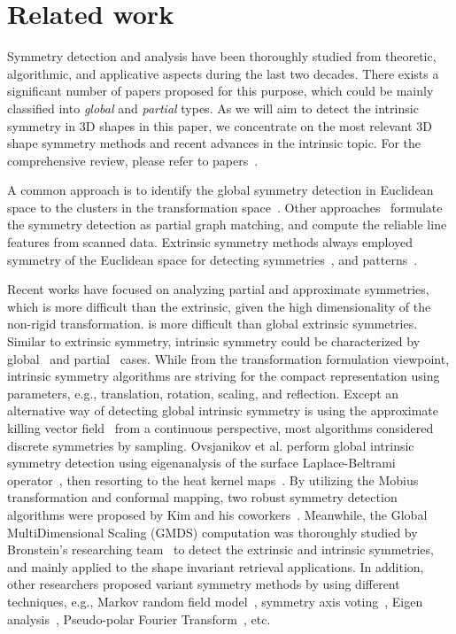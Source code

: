 \section{Related work}
\label{sec:related}

Symmetry detection and analysis have been thoroughly studied from theoretic, algorithmic, and applicative aspects during the last two decades.
There exists a significant number of papers proposed for this purpose, which could be mainly classified into \emph{global} and \emph{partial} types.
As we will aim to detect the intrinsic symmetry in 3D shapes in this paper, we concentrate on the most relevant 3D shape symmetry methods and recent advances in the intrinsic topic.
For the comprehensive review, please refer to papers~\cite{xu2009,berner2011}.

A common approach is to identify the global symmetry detection in Euclidean space to the clusters in the transformation space~\cite{mitra2006,podolak2006,pauly2008}. Other approaches~\cite{bokeloh2009,berner2011} formulate the symmetry detection as partial graph matching, and compute the reliable line features from scanned data.
Extrinsic symmetry methods always employed symmetry of the Euclidean space for detecting symmetries~\cite{zabrodsky1997,mitra2006,podolak2006},
and patterns~\cite{pauly2008,bokeloh2009,yeh2009,berner2011}.

Recent works have focused on analyzing partial and approximate symmetries, which is more difficult than the extrinsic, given the high dimensionality of the non-rigid transformation.
is more difficult than global extrinsic symmetries.
Similar to extrinsic symmetry, intrinsic symmetry could be characterized by global~\cite{ovsjanikov2008,bronstein2009,ben-chen2010,bokeloh2010,chertok2010,lipman2010,kim2010,hooda2011,kim2011} and partial~\cite{lasowski2009,xu2009,mitra2010,raviv2010,bronstein2011} cases. While from the transformation formulation viewpoint, intrinsic symmetry algorithms are striving for the compact representation using parameters, e.g., translation, rotation, scaling, and reflection. Except an alternative way of detecting global intrinsic symmetry is using the approximate killing vector field~\cite{ben-chen2010} from a continuous perspective, most algorithms considered discrete symmetries by sampling.
Ovsjanikov et al. perform global intrinsic symmetry detection using eigenanalysis of the surface Laplace-Beltrami operator~\cite{ovsjanikov2008}, then resorting to the heat kernel maps~\cite{ovsjanikov2010}. By utilizing the Mobius transformation and conformal mapping, two robust symmetry detection algorithms were proposed by Kim and his coworkers~\cite{kim2010,kim2011}. Meanwhile, the Global MultiDimensional Scaling (GMDS) computation was thoroughly studied by Bronstein's researching team~\cite{bronstein2006,bronstein2009,raviv2010,bronstein2011} to detect the extrinsic and intrinsic symmetries, and mainly applied to the shape invariant retrieval applications. In addition, other researchers proposed variant symmetry methods by using different techniques, e.g., Markov random field model~\cite{lasowski2009}, symmetry axis voting~\cite{xu2009}, Eigen analysis~\cite{chertok2010,lipman2010}, Pseudo-polar Fourier Transform~\cite{bermanis2010}, etc.

